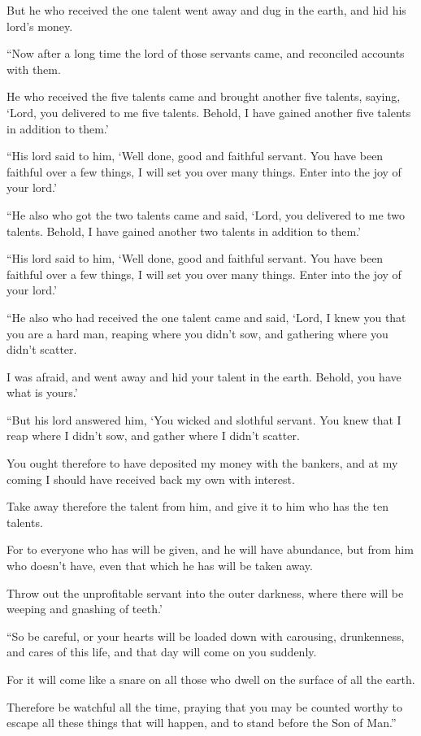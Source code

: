But he who received the one talent went away and dug in the earth, and hid his lord’s money.

“Now after a long time the lord of those servants came, and reconciled accounts with them.

He who received the five talents came and brought another five talents, saying, ‘Lord, you delivered to me five talents. Behold, I have gained another five talents in addition to them.’

“His lord said to him, ‘Well done, good and faithful servant. You have been faithful over a few things, I will set you over many things. Enter into the joy of your lord.’

“He also who got the two talents came and said, ‘Lord, you delivered to me two talents. Behold, I have gained another two talents in addition to them.’

“His lord said to him, ‘Well done, good and faithful servant. You have been faithful over a few things, I will set you over many things. Enter into the joy of your lord.’

“He also who had received the one talent came and said, ‘Lord, I knew you that you are a hard man, reaping where you didn’t sow, and gathering where you didn’t scatter.

I was afraid, and went away and hid your talent in the earth. Behold, you have what is yours.’

“But his lord answered him, ‘You wicked and slothful servant. You knew that I reap where I didn’t sow, and gather where I didn’t scatter.

You ought therefore to have deposited my money with the bankers, and at my coming I should have received back my own with interest.

Take away therefore the talent from him, and give it to him who has the ten talents.

For to everyone who has will be given, and he will have abundance, but from him who doesn’t have, even that which he has will be taken away.

Throw out the unprofitable servant into the outer darkness, where there will be weeping and gnashing of teeth.’

“So be careful, or your hearts will be loaded down with carousing, drunkenness, and cares of this life, and that day will come on you suddenly.

For it will come like a snare on all those who dwell on the surface of all the earth.

Therefore be watchful all the time, praying that you may be counted worthy to escape all these things that will happen, and to stand before the Son of Man.”

